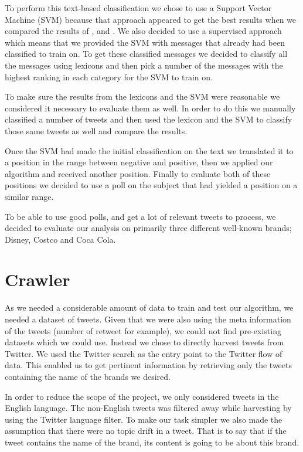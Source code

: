 \documentclass[a4paper,12pt]{report}
\begin{document}
To perform this text-based classification we chose to use a Support Vector Machine (SVM) because that approach appeared to get the best results when we compared the results of \cite{Pang02}, \cite{Turney02} and \cite{Taboada10}.
We also decided to use a supervised approach which means that we provided the SVM with messages that already had been classified to train on.
To get these classified messages we decided to classify all the messages using lexicons and then pick a number of the messages with the highest ranking in each category for the SVM to train on.

To make sure the results from the lexicons and the SVM were reasonable we considered it necessary to evaluate them as well. 
In order to do this we manually classified a number of tweets and then used the lexicon and the SVM to classify those same tweets as well and compare the results.

Once the SVM had made the initial classification on the text we translated it to a position in the range between negative and positive, then we applied our algorithm and received another position. Finally to evaluate both of these positions we decided to use a poll on the subject that had yielded a position on a similar range.

To be able to use good polls, and get a lot of relevant tweets to process, we decided to evaluate our analysis on primarily three different well-known brands; Disney, Costco and Coca Cola.

\section{Crawler}

As we needed a considerable amount of data to train and test our algorithm, we needed a dataset of tweets. 
Given that we were also using the meta information of the tweets (number of retweet for example), we could not find pre-existing datasets which we could use.
Instead we chose to directly harvest tweets from Twitter.
We used the Twitter search as the entry point to the Twitter flow of data. 
This enabled us to get pertinent information by retrieving only the tweets containing the name of the brands we desired.

In order to reduce the scope of the project, we only considered tweets in the English language. 
The non-English tweets was filtered away while harvesting by using the Twitter language filter.
To make our task simpler we also made the assumption that there were no topic drift in a tweet. 
That is to say that if the tweet contains the name of the brand, its content is going to be about this brand.
\end{document}
